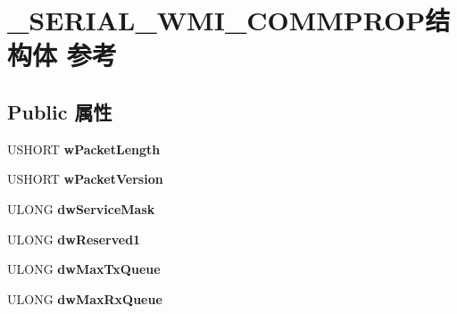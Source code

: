 \hypertarget{struct___s_e_r_i_a_l___w_m_i___c_o_m_m_p_r_o_p}{}\section{\+\_\+\+S\+E\+R\+I\+A\+L\+\_\+\+W\+M\+I\+\_\+\+C\+O\+M\+M\+P\+R\+O\+P结构体 参考}
\label{struct___s_e_r_i_a_l___w_m_i___c_o_m_m_p_r_o_p}
\subsection*{Public 属性}
\begin{DoxyCompactItemize}
\item 
\mbox{\label{struct___s_e_r_i_a_l___w_m_i___c_o_m_m_p_r_o_p_a9ac0a5fbbe3782c4ee05053550cc2459}} 
U\+S\+H\+O\+RT {\bfseries w\+Packet\+Length}
\item 
\mbox{\label{struct___s_e_r_i_a_l___w_m_i___c_o_m_m_p_r_o_p_ae5d60abe0d81f10bee361aac33152e93}} 
U\+S\+H\+O\+RT {\bfseries w\+Packet\+Version}
\item 
\mbox{\label{struct___s_e_r_i_a_l___w_m_i___c_o_m_m_p_r_o_p_a96942852389c7e9bad3a959513be5208}} 
U\+L\+O\+NG {\bfseries dw\+Service\+Mask}
\item 
\mbox{\label{struct___s_e_r_i_a_l___w_m_i___c_o_m_m_p_r_o_p_a2c9ec3b61073ee4302c64805ec46fb45}} 
U\+L\+O\+NG {\bfseries dw\+Reserved1}
\item 
\mbox{\label{struct___s_e_r_i_a_l___w_m_i___c_o_m_m_p_r_o_p_a678a6bc11722783ffb04b258a8343211}} 
U\+L\+O\+NG {\bfseries dw\+Max\+Tx\+Queue}
\item 
\mbox{\label{struct___s_e_r_i_a_l___w_m_i___c_o_m_m_p_r_o_p_abee8a05c58017dccb5222f40556285c0}} 
U\+L\+O\+NG {\bfseries dw\+Max\+Rx\+Queue}
\item 
\mbox{\label{struct___s_e_r_i_a_l___w_m_i___c_o_m_m_p_r_o_p_a6d4f3d7019c3d92db37dd9872a1160cf}} 

\end{DoxyCompactItemize}
